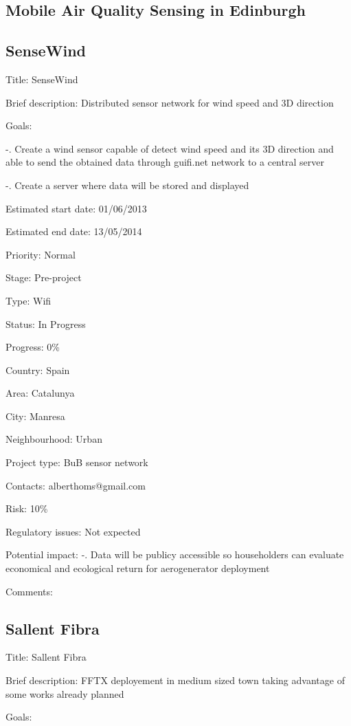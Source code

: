\documentclass[draftclsnofoot,12pt,journal,onecolumn]{IEEEtran}
\begin{document}
\subsection{Mobile Air Quality Sensing in Edinburgh}

\subsection{SenseWind}
Title: SenseWind 

Brief description: Distributed sensor network for wind speed and 3D direction 

Goals: 

-. Create a wind sensor capable of detect wind speed and its 3D direction and 
able to send the obtained data through guifi.net network to a central server 

-. Create a server where data will be stored and displayed 

Estimated start date: 01/06/2013 

Estimated end date: 13/05/2014 

Priority: Normal 

Stage: Pre-project 

Type: Wifi 

Status: In Progress 

Progress: 0\% 

Country: Spain 

Area: Catalunya 

City: Manresa 

Neighbourhood: Urban 

Project type: BuB sensor network 

Contacts: alberthoms@gmail.com

Risk: 10\% 

Regulatory issues: Not expected 

Potential impact: -. Data will be publicy accessible so householders can 
evaluate economical and ecological return for aerogenerator deployment 

Comments: 

\subsection{Sallent Fibra} 

Title: Sallent Fibra 

Brief description: FFTX deployement in medium sized town taking advantage of 
some works already planned 

Goals: 
\end{document}
